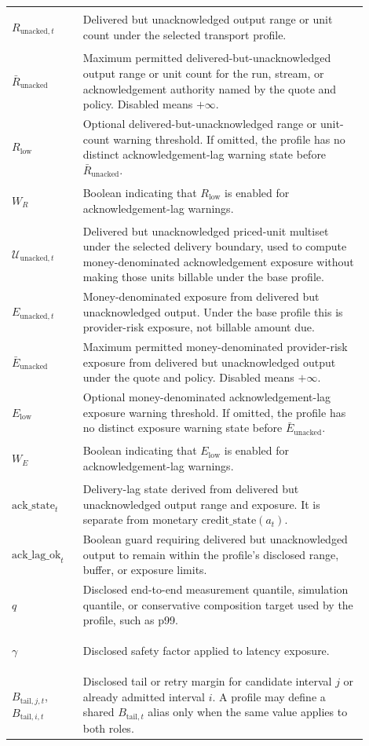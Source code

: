 \documentclass[11pt]{article}
\begin{document}
\begin{longtable}{>{\bfseries\raggedright\arraybackslash}p{0.18\linewidth} >{\raggedright\arraybackslash}p{0.72\linewidth}}
\(R_{\mathrm{unacked},t}\) & Delivered but unacknowledged output range or unit count under the selected transport profile. \\
\(\bar{R}_{\mathrm{unacked}}\) & Maximum permitted delivered-but-unacknowledged output range or unit count for the run, stream, or acknowledgement authority named by the quote and policy. Disabled means \(+\infty\). \\
\(R_{\mathrm{low}}\) & Optional delivered-but-unacknowledged range or unit-count warning threshold. If omitted, the profile has no distinct acknowledgement-lag warning state before \(\bar{R}_{\mathrm{unacked}}\). \\
\(W_R\) & Boolean indicating that \(R_{\mathrm{low}}\) is enabled for acknowledgement-lag warnings. \\
\(\mathcal{U}_{\mathrm{unacked},t}\) & Delivered but unacknowledged priced-unit multiset under the selected delivery boundary, used to compute money-denominated acknowledgement exposure without making those units billable under the base profile. \\
\(E_{\mathrm{unacked},t}\) & Money-denominated exposure from delivered but unacknowledged output. Under the base profile this is provider-risk exposure, not billable amount due. \\
\(\bar{E}_{\mathrm{unacked}}\) & Maximum permitted money-denominated provider-risk exposure from delivered but unacknowledged output under the quote and policy. Disabled means \(+\infty\). \\
\(E_{\mathrm{low}}\) & Optional money-denominated acknowledgement-lag exposure warning threshold. If omitted, the profile has no distinct exposure warning state before \(\bar{E}_{\mathrm{unacked}}\). \\
\(W_E\) & Boolean indicating that \(E_{\mathrm{low}}\) is enabled for acknowledgement-lag warnings. \\
\(\mathrm{ack\_state}_t\) & Delivery-lag state derived from delivered but unacknowledged output range and exposure. It is separate from monetary \(\mathrm{credit\_state}(a_t)\). \\
\(\mathrm{ack\_lag\_ok}_t\) & Boolean guard requiring delivered but unacknowledged output to remain within the profile's disclosed range, buffer, or exposure limits. \\
\(q\) & Disclosed end-to-end measurement quantile, simulation quantile, or conservative composition target used by the profile, such as p99. \\
\(\gamma\) & Disclosed safety factor applied to latency exposure. \\
\(B_{\mathrm{tail},j,t}\), \(B_{\mathrm{tail},i,t}\) & Disclosed tail or retry margin for candidate interval \(j\) or already admitted interval \(i\). A profile may define a shared \(B_{\mathrm{tail},t}\) alias only when the same value applies to both roles. \\
\bottomrule
\end{longtable}
\end{document}
